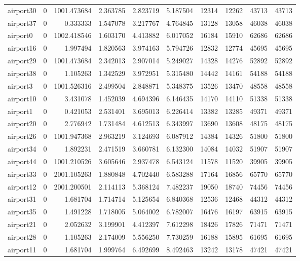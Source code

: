 \begin{longtable}{|l|r|r|r|r|r|r|r|r|r|}
airport30 & 0 & 1001.473684 & 2.363785 & 2.823719 & 5.187504 & 12314 & 12262 & 43713 & 43713 \\
airport37 & 0 & 0.333333 & 1.547078 & 3.217767 & 4.764845 & 13128 & 13058 & 46038 & 46038 \\
airport0 & 0 & 1002.418546 & 1.603170 & 4.413882 & 6.017052 & 16184 & 15910 & 62686 & 62686 \\
airport16 & 0 & 1.997494 & 1.820563 & 3.974163 & 5.794726 & 12832 & 12774 & 45695 & 45695 \\
airport29 & 0 & 1001.473684 & 2.342013 & 2.907014 & 5.249027 & 14328 & 14276 & 52892 & 52892 \\
airport38 & 0 & 1.105263 & 1.342529 & 3.972951 & 5.315480 & 14442 & 14161 & 54188 & 54188 \\
airport3 & 0 & 1001.526316 & 2.499504 & 2.848871 & 5.348375 & 13526 & 13470 & 48558 & 48558 \\
airport10 & 0 & 3.431078 & 1.452039 & 4.694396 & 6.146435 & 14170 & 14110 & 51338 & 51338 \\
airport1 & 0 & 0.421053 & 2.531401 & 3.695013 & 6.226414 & 13382 & 13285 & 49371 & 49371 \\
airport20 & 0 & 2.776942 & 1.731484 & 4.612513 & 6.343997 & 13690 & 13608 & 48175 & 48175 \\
airport26 & 0 & 1001.947368 & 2.963219 & 3.124693 & 6.087912 & 14384 & 14326 & 51800 & 51800 \\
airport34 & 0 & 1.892231 & 2.471519 & 3.660781 & 6.132300 & 14084 & 14032 & 51907 & 51907 \\
airport44 & 0 & 1001.210526 & 3.605646 & 2.937478 & 6.543124 & 11578 & 11520 & 39905 & 39905 \\
airport33 & 0 & 2001.105263 & 1.880848 & 4.702440 & 6.583288 & 17164 & 16856 & 65770 & 65770 \\
airport12 & 0 & 2001.200501 & 2.114113 & 5.368124 & 7.482237 & 19050 & 18740 & 74456 & 74456 \\
airport31 & 0 & 1.681704 & 1.714714 & 5.125654 & 6.840368 & 12536 & 12468 & 44312 & 44312 \\
airport35 & 0 & 1.491228 & 1.718005 & 5.064002 & 6.782007 & 16476 & 16197 & 63915 & 63915 \\
airport21 & 0 & 2.052632 & 3.199901 & 4.412397 & 7.612298 & 18426 & 17826 & 71471 & 71471 \\
airport28 & 0 & 1.105263 & 2.174009 & 5.556250 & 7.730259 & 16188 & 15895 & 61695 & 61695 \\
airport11 & 0 & 1.681704 & 1.999764 & 6.492699 & 8.492463 & 13242 & 13178 & 47421 & 47421 \\

\end{longtable}
